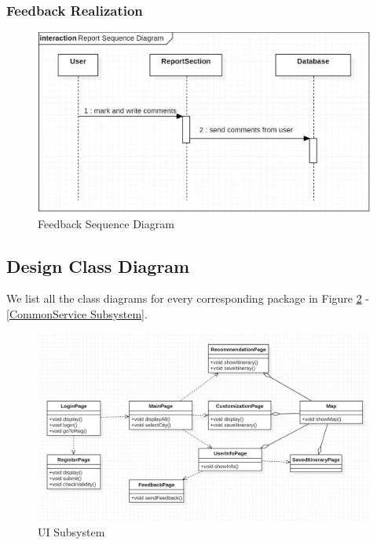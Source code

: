 \documentclass[10pt]{article}
\begin{document}
\subsubsection{Feedback Realization}
\begin{figure}[H]
    \centering
    
    \includegraphics[width=14cm]{report.jpg}
    \caption{Feedback Sequence Diagram}
    \label{Feedback Sequence Diagram}
\end{figure}

\subsection{Design Class Diagram}
We list all the class diagrams for every corresponding package in Figure \ref{UI Subsystem} -\ref{CommonService Subsystem}.

\begin{figure}[H]
    \centering
    
    \includegraphics[width=14cm]{ui.png}
    \caption{UI Subsystem}
    \label{UI Subsystem}
\end{figure}
\end{document}
